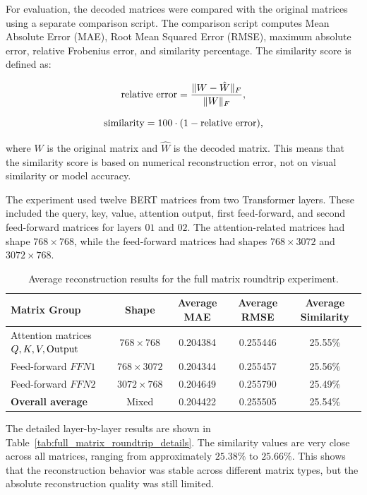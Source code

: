 \documentclass{article}
\begin{document}
\begin{normalsize}
For evaluation, the decoded matrices were compared with the original matrices using a separate comparison script. The comparison script computes Mean Absolute Error (MAE), Root Mean Squared Error (RMSE), maximum absolute error, relative Frobenius error, and similarity percentage. The similarity score is defined as:

\[
\textnormal{relative error}
=
\frac{\lVert W - \hat{W} \rVert_F}{\lVert W \rVert_F},
\]

\[
\textnormal{similarity}
=
100 \cdot (1 - \textnormal{relative error}),
\]

where \(W\) is the original matrix and \(\hat{W}\) is the decoded matrix. This means that the similarity score is based on numerical reconstruction error, not on visual similarity or model accuracy.

The experiment used twelve BERT matrices from two Transformer layers. These included the query, key, value, attention output, first feed-forward, and second feed-forward matrices for layers \(01\) and \(02\). The attention-related matrices had shape \(768 \times 768\), while the feed-forward matrices had shapes \(768 \times 3072\) and \(3072 \times 768\).

\begin{table}[H]
\centering
\scriptsize
\begin{tabular}{|l|c|c|c|c|}
\hline
\textbf{Matrix Group} & \textbf{Shape} & \textbf{Average MAE} & \textbf{Average RMSE} & \textbf{Average Similarity} \\
\hline
Attention matrices \(Q,K,V,\textnormal{Output}\) & \(768 \times 768\) & 0.204384 & 0.255446 & 25.55\% \\
\hline
Feed-forward \(FFN1\) & \(768 \times 3072\) & 0.204344 & 0.255457 & 25.56\% \\
\hline
Feed-forward \(FFN2\) & \(3072 \times 768\) & 0.204649 & 0.255790 & 25.49\% \\
\hline
\textbf{Overall average} & Mixed & 0.204422 & 0.255505 & 25.54\% \\
\hline
\end{tabular}
\caption{Average reconstruction results for the full matrix roundtrip experiment.}
\label{tab:full_matrix_roundtrip_average}
\end{table}

The detailed layer-by-layer results are shown in Table~\ref{tab:full_matrix_roundtrip_details}. The similarity values are very close across all matrices, ranging from approximately \(25.38\%\) to \(25.66\%\). This shows that the reconstruction behavior was stable across different matrix types, but the absolute reconstruction quality was still limited.


\end{normalsize}
\end{document}
